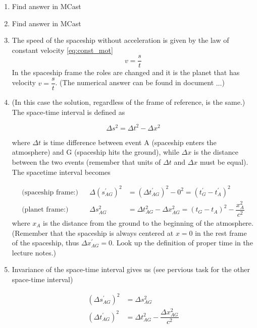 \documentclass[a4paper,10pt,english]{article}
\begin{document}
\begin{enumerate}

\item Find answer in MCast

\item Find answer in MCast\\

\item The speed of the spaceship without acceleration is given by the law of constant velocity \ref{eq:const_mot}
\[v=\dfrac{s}{t}\]
In the spaceship frame the roles are changed and it is the planet that has velocity $v=\dfrac{s}{t}$. (The numerical answer can be found in document $\ldots$)

\item (In this case the solution, regardless of the frame of reference, is the same.) The space-time interval is defined as

\begin{equation*}
\Delta s^2=\Delta t^2-\Delta x^2
\end{equation*}

where $\Delta t$ is time difference between event A (spaceship enters the atmosphere) and G (spaceship hits the ground), while $\Delta x$ is the distance between the two events (remember that units of $\Delta t$ and $\Delta x$ must be equal). The spacetime interval becomes

\begin{align*}
\text{(spaceship frame:)} && \Delta (s_{AG}^{\prime})^2&=(\Delta t_{AG}^{\prime})^{2}-0^{2}=\left(t_G^{\prime}-t_A^{\prime}\right)^2\\
\text{(planet frame:)} && \Delta s_{AG}^2&=\Delta t_{AG}^2-\Delta x_{AG}^2=\left(t_G-t_A\right)^2-\dfrac{x_A^2}{c^2}
\end{align*}
where $x_A$ is the distance from the ground to the beginning of the atmosphere.\\ (Remember that the spaceship is always centered at $x=0$ in the rest frame of the spaceship, thus $\Delta x^{\prime}_{AG}=0$. Look up the definition of proper time in the lecture notes.)

\item Invariance of the space-time interval gives us (see pervious task for the other space-time interval)

\begin{align*}
(\Delta s_{AG}^{\prime})^{2}&=\Delta s_{AG}^{2}\\
(\Delta t_{AG}^{\prime})^2&=\Delta t_{AG}^2-\dfrac{\Delta x_{AG}^2}{c^2}
\end{align*}


\end{enumerate}
\end{document}
